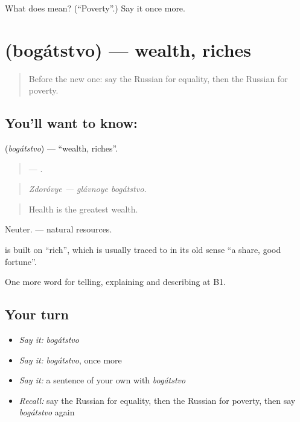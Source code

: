 \begin{tcolorbox}[breakable,colback=teal!4,colframe=teal!35!black,title={Before you move on}]
What does  mean? (\textquotedblleft{}Poverty\textquotedblright{}.) Say it once more.
\end{tcolorbox}
\section[\texorpdfstring{\ru{богатство} (bogátstvo)}{богатство (bogátstvo)}]{ (bogátstvo) — wealth, riches}

\label{lesson:RU-C367-bogatstvo}



\begin{quote}
Before the new one: say the Russian for equality, then the Russian for poverty.
\end{quote}

\subsection*{You'll want to know: }
\textbf{} (\emph{bogátstvo}) — \textquotedblleft{}wealth, riches\textquotedblright{}.

\begin{quote}
 —  .
\end{quote}

\begin{quote}
\emph{Zdoróvye — glávnoye bogátstvo.}
\end{quote}

\begin{quote}
Health is the greatest wealth.
\end{quote}

Neuter. \emph{ } — natural resources.

\begin{cousinweb}
\textbf{} is built on \emph{} \textquotedblleft{}rich\textquotedblright{}, which is usually traced to \emph{} in its old sense \textquotedblleft{}a share, good fortune\textquotedblright{}.
\end{cousinweb}

\begin{grammarlens}[title={What you've built}]
One more word for telling, explaining and describing at B1.
\end{grammarlens}

\subsection*{Your turn}
\begin{itemize}
\raggedright
  \item \emph{Say it:} \emph{bogátstvo}
  \item \emph{Say it:} \emph{bogátstvo}, once more
  \item \emph{Say it:} a sentence of your own with \emph{bogátstvo}
  \item \emph{Recall:} say the Russian for equality, then the Russian for poverty, then say \emph{bogátstvo} again
\end{itemize}

